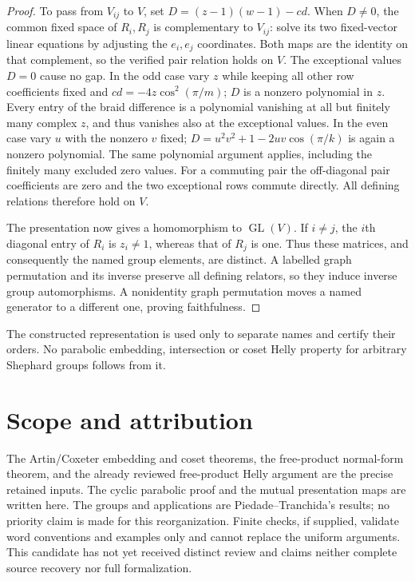 \begin{proof}
To pass from $V_{ij}$ to $V$, set
$D=(z-1)(w-1)-cd$. When $D\ne0$, the common fixed space of
$R_i,R_j$ is complementary to $V_{ij}$: solve its two fixed-vector
linear equations by adjusting the $e_i,e_j$ coordinates. Both maps
are the identity on that complement, so the verified pair relation
holds on $V$. The exceptional values $D=0$ cause no gap. In the odd
case vary $z$ while keeping all other row coefficients fixed and
$cd=-4z\cos^2(\pi/m)$; $D$ is a nonzero polynomial in $z$.
Every entry of the braid difference is a polynomial vanishing at all
but finitely many complex $z$, and thus vanishes also at the exceptional
values. In the even case vary $u$ with the nonzero $v$ fixed;
$D=u^2v^2+1-2uv\cos(\pi/k)$ is again a nonzero polynomial.
The same polynomial argument applies, including the finitely many
excluded zero values. For a commuting pair the off-diagonal pair
coefficients are zero and the two exceptional rows commute directly.
All defining relations therefore hold on $V$.

The presentation now gives a homomorphism to $\operatorname{GL}(V)$.
If $i\ne j$, the $i$th diagonal entry of $R_i$ is $z_i\ne1$,
whereas that of $R_j$ is one. Thus these matrices, and consequently
the named group elements, are distinct. A labelled graph permutation
and its inverse preserve all defining relators, so they induce inverse
group automorphisms. A nonidentity graph permutation moves a named
generator to a different one, proving faithfulness.
\end{proof}
The constructed representation is used only to separate names and
certify their orders. No parabolic embedding, intersection or coset
Helly property for arbitrary Shephard groups follows from it.

\section{Scope and attribution}
The Artin/Coxeter embedding and coset theorems, the free-product
normal-form theorem, and the already reviewed free-product Helly
argument are the precise retained inputs. The cyclic parabolic proof
and the mutual presentation maps are written here. The groups and
applications are Piedade--Tranchida's results; no priority claim is
made for this reorganization. Finite checks, if supplied, validate
word conventions and examples only and cannot replace the uniform
arguments. This candidate has not yet received distinct review and
claims neither complete source recovery nor full formalization.


